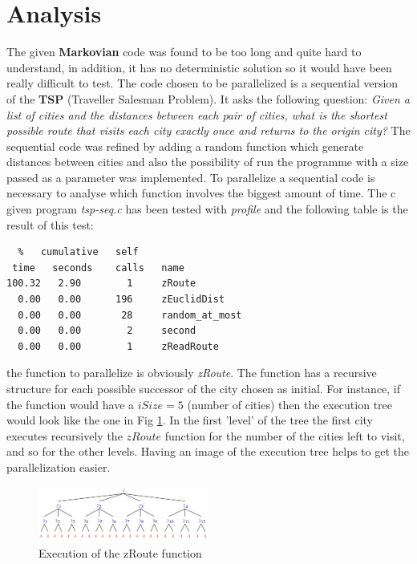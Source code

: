 \documentclass[11pt,conference]{IEEEtran}
\begin{document}
\section{Analysis}
The given \textbf{Markovian} code was found to be too long and quite hard to understand, in addition, it has no deterministic solution so it would have been really difficult to test.
\newline
The code chosen to be parallelized is a sequential version of the \textbf{TSP} (Traveller Salesman Problem). It asks the following question: \textit{Given a list of cities and the distances between each pair of cities, what is the shortest possible route that visits each city exactly once and returns to the origin city?} \cite{citation1}
\newline
The sequential code was refined by adding a random function which generate distances between cities and also the possibility of run the programme with a size passed as a parameter was implemented.
\newline
To parallelize a sequential code is necessary to analyse which function involves the biggest amount of time. The c given program \textit{tsp-seq.c} has been tested with \textit{profile} and the following table is the result of this test:
\begin{lstlisting}
  %   cumulative   self               
 time   seconds    calls   name    
100.32   2.90        1     zRoute
  0.00   0.00      196     zEuclidDist
  0.00   0.00       28     random_at_most
  0.00   0.00        2     second
  0.00   0.00        1     zReadRoute
\end{lstlisting}

the function to parallelize is obviously \textit{zRoute}.
\newline
The function has a recursive structure for each possible successor of the city chosen as initial. For instance, if the function would have a $iSize = 5$ (number of cities) then the execution tree would look like the one in Fig \ref{fig:tree}. 
In the first 'level' of the tree the first city executes recursively the $zRoute$ function for the number of the cities left to visit, and so for the other levels.
Having an image of the execution tree helps to get the parallelization easier.
\begin{figure}[h!]
  \centering
    \includegraphics[width=0.5\textwidth]{tree}
    \caption{Execution of the zRoute function}
    \label{fig:tree}
\end{figure}
\end{document}
